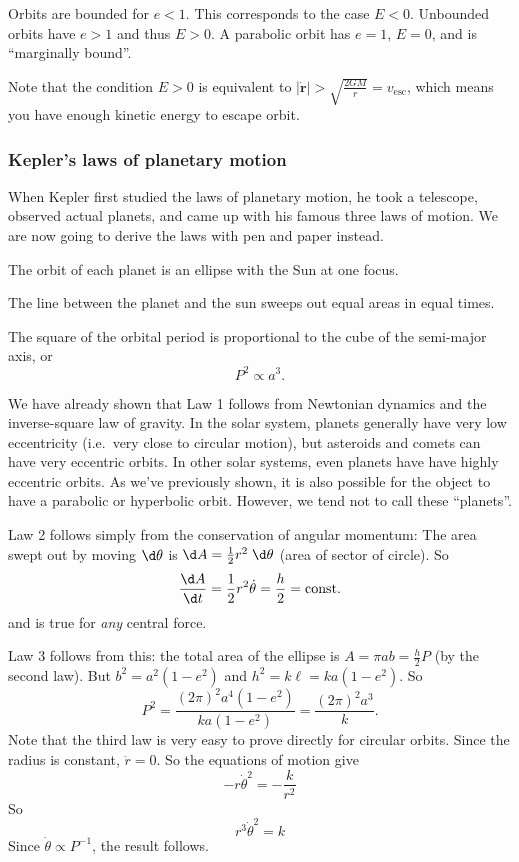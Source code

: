 \documentclass[a4paper]{article}
\begin{document}
Orbits are bounded for $e < 1$. This corresponds to the case $E < 0$. Unbounded orbits have $e > 1$ and thus $E > 0$. A parabolic orbit has $e = 1$, $E = 0$, and is ``marginally bound''.

Note that the condition $E > 0$ is equivalent to $|\dot{\mathbf{r}}| > \sqrt{\frac{2GM}{r}} = v_{\mathrm{esc}}$, which means you have enough kinetic energy to escape orbit.

\subsubsection*{Kepler's laws of planetary motion}
When Kepler first studied the laws of planetary motion, he took a telescope, observed actual planets, and came up with his famous three laws of motion. We are now going to derive the laws with pen and paper instead.

\begin{law}
  The orbit of each planet is an ellipse with the Sun at one focus.
\end{law}

\begin{law}
  The line between the planet and the sun sweeps out equal areas in equal times.
\end{law}

\begin{law}
  The square of the orbital period is proportional to the cube of the semi-major axis, or
  \[
    P^2 \propto a^3.
  \]
\end{law}

We have already shown that Law 1 follows from Newtonian dynamics and the inverse-square law of gravity. In the solar system, planets generally have very low eccentricity (i.e.\ very close to circular motion), but asteroids and comets can have very eccentric orbits. In other solar systems, even planets have have highly eccentric orbits. As we've previously shown, it is also possible for the object to have a parabolic or hyperbolic orbit. However, we tend not to call these ``planets''.

Law 2 follows simply from the conservation of angular momentum: The area swept out by moving $\d \theta$ is $\d A = \frac{1}{2}r^2\;\d \theta$ (area of sector of circle). So
\[
  \frac{\d A}{\d t} = \frac{1}{2}r^2\dot{\theta} = \frac{h}{2} = \text{const}.
\]
and is true for \emph{any} central force.

Law 3 follows from this: the total area of the ellipse is $A = \pi ab = \frac{h}{2}P$ (by the second law). But $b^2 = a^2( 1 - e^2)$ and $h^2 = k\ell = ka(1 - e^2)$. So
\[
  P^2 = \frac{(2\pi)^2a^4(1 - e^2)}{ka(1 - e^2)} = \frac{(2\pi)^2 a^3}{k}.
\]
Note that the third law is very easy to prove directly for circular orbits. Since the radius is constant, $\ddot{r} = 0$. So the equations of motion give
\[
  -r \dot{\theta}^2 = -\frac{k}{r^2}
\]
So
\[
  r^3 \dot{\theta}^2 = k
\]
Since $\dot{\theta}\propto P^{-1}$, the result follows.
\end{document}
